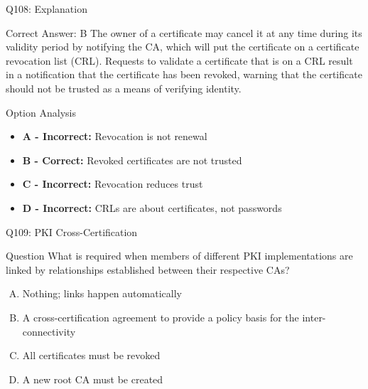 \documentclass{beamer}
\begin{document}
	\begin{frame}{Q108: Explanation}
		\begin{block}{Correct Answer: B}
			The owner of a certificate may cancel it at any time during its validity period by notifying the CA, which will put the certificate on a certificate revocation list (CRL). Requests to validate a certificate that is on a CRL result in a notification that the certificate has been revoked, warning that the certificate should not be trusted as a means of verifying identity.
		\end{block}
		\begin{block}{Option Analysis}
			\begin{itemize}
				\item \textbf{A - Incorrect:} Revocation is not renewal
				\item \textbf{B - Correct:} Revoked certificates are not trusted
				\item \textbf{C - Incorrect:} Revocation reduces trust
				\item \textbf{D - Incorrect:} CRLs are about certificates, not passwords
			\end{itemize}
		\end{block}
	\end{frame}
	
	\begin{frame}{Q109: PKI Cross-Certification}
		\begin{block}{Question}
			What is required when members of different PKI implementations are linked by relationships established between their respective CAs?
		\end{block}
		\begin{enumerate}[(A)]
			\item Nothing; links happen automatically
			\item A cross-certification agreement to provide a policy basis for the inter-connectivity
			\item All certificates must be revoked
			\item A new root CA must be created
		\end{enumerate}
	\end{frame}
	
\end{document}

